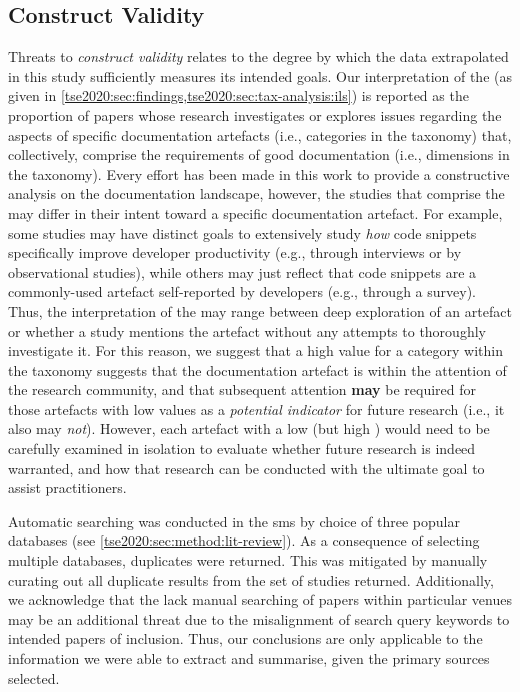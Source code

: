 \subsection{Construct Validity}\label{tse2020:sec:threats:construct}

Threats to \textit{construct validity} relates to the degree by which the data extrapolated in this study sufficiently measures its intended goals. Our interpretation of the  (as given in \cref{tse2020:sec:findings,tse2020:sec:tax-analysis:ils}) is reported as the proportion of papers whose research investigates or explores issues regarding the aspects of specific  documentation artefacts (i.e., categories in the taxonomy) that, collectively, comprise the requirements of good  documentation (i.e., dimensions in the taxonomy). Every effort has been made in this work to provide a constructive analysis on the  documentation landscape, however, the studies that comprise the  may differ in their intent toward a specific documentation artefact. For example, some studies may have distinct goals to extensively study \textit{how} code snippets  specifically improve developer productivity (e.g., through interviews or by observational studies), while others may just reflect that code snippets are a commonly-used artefact self-reported by developers (e.g., through a survey). Thus, the interpretation of the  may range between deep exploration of an artefact or whether a study mentions the artefact without any attempts to thoroughly investigate it. For this reason, we suggest that a high  value for a category within the taxonomy suggests that the documentation artefact is within the attention of the research community, and that subsequent attention \textbf{may} be required for those artefacts with low  values as a \textit{potential indicator} for future research (i.e., it also may \textit{not}). However, each artefact with a low  (but high ) would need to be carefully examined in isolation to evaluate whether future research is indeed warranted, and how that research can be conducted with the ultimate goal to assist practitioners.

Automatic searching was conducted in the \gls{sms} by choice of three popular databases (see \cref{tse2020:sec:method:lit-review}). As a consequence of selecting multiple databases, duplicates were returned. This was mitigated by manually curating out all duplicate results from the set of studies returned. Additionally, we acknowledge that the lack manual searching of papers within particular venues may be an additional threat due to the misalignment of search query keywords to intended papers of inclusion. Thus, our conclusions are only applicable to the information we were able to extract and summarise, given the primary sources selected.

